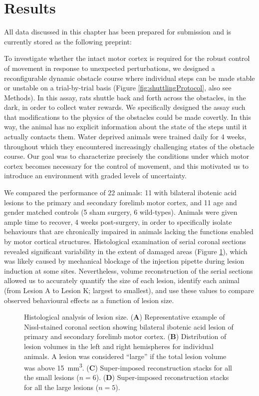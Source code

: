 \section{Results}

All data discussed in this chapter has been prepared for submission and is currently stored as the following preprint:
\bigskip

To investigate whether the intact motor cortex is required for the robust control of movement in response to unexpected perturbations, we designed a reconfigurable dynamic obstacle course where individual steps can be made stable or unstable on a trial-by-trial basis (Figure \ref{fig:shuttlingProtocol}, also see Methods). In this assay, rats shuttle back and forth across the obstacles, in the dark, in order to collect water rewards. We specifically designed the assay such that modifications to the physics of the obstacles could be made covertly. In this way, the animal has no explicit information about the state of the steps until it actually contacts them. Water deprived animals were trained daily for 4 weeks, throughout which they encountered increasingly challenging states of the obstacle course. Our goal was to characterize precisely the conditions under which motor cortex becomes necessary for the control of movement, and this motivated us to introduce an environment with graded levels of uncertainty.

We compared the performance of 22 animals: 11 with bilateral ibotenic acid lesions to the primary and secondary forelimb motor cortex, and 11 age and gender matched controls (5 sham surgery, 6 wild-types). Animals were given ample time to recover, 4 weeks post-surgery, in order to specifically isolate behaviours that are chronically impaired in animals lacking the functions enabled by motor cortical structures. Histological examination of serial coronal sections revealed significant variability in the extent of damaged areas (Figure \ref{fig:histology}), which was likely caused by mechanical blockage of the injection pipette during lesion induction at some sites. Nevertheless, volume reconstruction of the serial sections allowed us to accurately quantify the size of each lesion, identify each animal (from Lesion A to Lesion K; largest to smallest), and use these values to compare observed behavioural effects as a function of lesion size.

\begin{figure}
\centering

\caption{Histological analysis of lesion size. (\textbf{A}) Representative example of Nissl-stained coronal section showing bilateral ibotenic acid lesion of primary and secondary forelimb motor cortex. (\textbf{B}) Distribution of lesion volumes in the left and right hemispheres for individual animals. A lesion was considered ``large'' if the total lesion volume was above \SI{15}{\milli\meter\cubed}. (\textbf{C}) Super-imposed reconstruction stacks for all the small lesions ($n = 6$). (\textbf{D}) Super-imposed reconstruction stacks for all the large lesions ($n = 5$).}
\label{fig:histology}
\end{figure}

